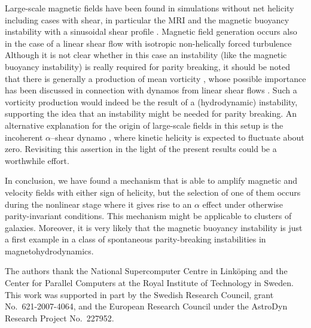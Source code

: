 \documentclass[twocolumn,showpacs,preprintnumbers,superscriptaddress]{revtex4}
\begin{document}
Large-scale magnetic fields have been
found in simulations without net helicity including cases with shear,
in particular the MRI \cite{BNST} and the magnetic buoyancy instability
with a sinusoidal shear profile \cite{Cline}.
Magnetic field generation occurs also in the case of a linear shear flow with
isotropic non-helically forced turbulence
Although it is not clear whether in this case an instability (like the
magnetic buoyancy instability) is really required for parity breaking,
it should be noted that there is generally a production of mean vorticity
\cite{Elp07,KMB09}, whose possible importance has been discussed in connection
with dynamos from linear shear flows \cite{Yousef}.
Such a vorticity production would indeed be the result of
a (hydrodynamic) instability, supporting
the idea that an instability might be needed for parity breaking.
An alternative explanation for the origin of large-scale fields in this setup
is the incoherent $\alpha$--shear dynamo \cite{VB97}, where kinetic helicity
is expected to fluctuate about zero.
Revisiting this assertion in the light of the present results
could be a worthwhile effort.

In conclusion, we have found a mechanism that is able to amplify magnetic
and velocity fields with either sign of helicity, but the selection
of one of them occurs during the nonlinear stage where it gives rise
to an $\alpha$ effect under otherwise parity-invariant conditions.
This mechanism might be applicable to clusters of galaxies.
Moreover, it is very likely
that the magnetic buoyancy instability is just a first
example in a class of spontaneous parity-breaking instabilities
in magnetohydrodynamics.

\acknowledgements

The authors thank the
National Supercomputer Centre in Link\"oping and the Center for
Parallel Computers at the Royal Institute of Technology in Sweden.
This work was supported in part by the Swedish Research Council,
grant No.\ 621-2007-4064, and the European Research Council under the
AstroDyn Research Project No.\ 227952.
\end{document}
